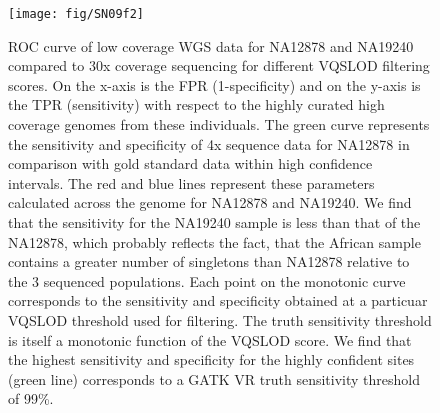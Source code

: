 \begin{figure}[htbp]
\centering
\texttt{[image: fig/SN09f2]}
\caption[\Gls{ROC} curve]{\gls{ROC} curve of low coverage \gls{WGS} data for NA12878 and NA19240 compared to 30x coverage sequencing for different \gls{VQSLOD} filtering scores. On the x-axis is the \gls{FPR} (1-specificity) and on the y-axis is the \gls{TPR} (sensitivity) with respect to the highly curated high coverage genomes from these individuals. The green curve represents the sensitivity and specificity of 4x sequence data for NA12878 in comparison with gold standard data within high confidence intervals. The red and blue lines represent these parameters calculated across the genome for NA12878 and NA19240. We find that the sensitivity for the NA19240 sample is less than that of the NA12878, which probably reflects the fact, that the African sample contains a greater number of singletons than NA12878 relative to the 3 sequenced populations. Each point on the monotonic curve corresponds to the sensitivity and specificity obtained at a particuar VQSLOD threshold used for filtering. The truth sensitivity threshold is itself a monotonic function of the VQSLOD score. We find that the highest sensitivity and specificity for the highly confident sites (green line) corresponds to a GATK \gls{VR} truth sensitivity threshold of 99\%.}
\label{fig:SN09f2}
\end{figure}